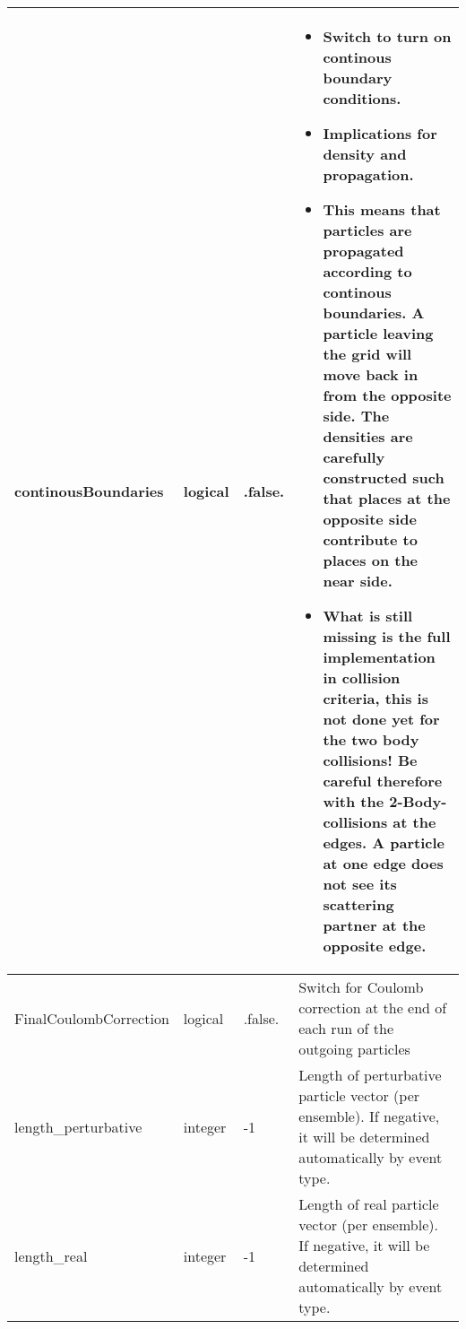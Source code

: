 \documentclass{article}
\begin{document}
\begin{longtable}{llll}
continousBoundaries & \begin{minipage}[t]{2cm}logical\end{minipage} & \begin{minipage}[t]{2cm}.false.\end{minipage} & \begin{minipage}[t]{12cm}\begin{itemize}\leftmargin0em\itemindent0pt\item Switch to turn on continous boundary conditions.\item Implications for density and propagation.\item This means that particles are propagated according to continous   boundaries. A particle leaving the grid will move back in from the   opposite side. The densities are carefully constructed such that places   at the opposite side contribute to places on the near side.\item What is still missing is the full implementation in collision criteria,   this is not done yet for the two body collisions!   Be careful therefore with the 2-Body-collisions at the edges.   A particle at one edge does not see its scattering partner at the   opposite edge.\end{itemize}\end{minipage}\\*
\midrule
FinalCoulombCorrection & \begin{minipage}[t]{2cm}logical\end{minipage} & \begin{minipage}[t]{2cm}.false.\end{minipage} & \begin{minipage}[t]{12cm}Switch for Coulomb correction at the end of each run of the outgoing particles\end{minipage}\\*
\midrule
length\_perturbative & \begin{minipage}[t]{2cm}integer\end{minipage} & \begin{minipage}[t]{2cm}-1\end{minipage} & \begin{minipage}[t]{12cm}Length of perturbative particle vector (per ensemble). If negative, it will be determined automatically by event type.\end{minipage}\\*
\midrule
length\_real & \begin{minipage}[t]{2cm}integer\end{minipage} & \begin{minipage}[t]{2cm}-1\end{minipage} & \begin{minipage}[t]{12cm}Length of real particle vector (per ensemble). If negative, it will be determined automatically by event type.\end{minipage}\\*

\end{longtable}
\end{document}

